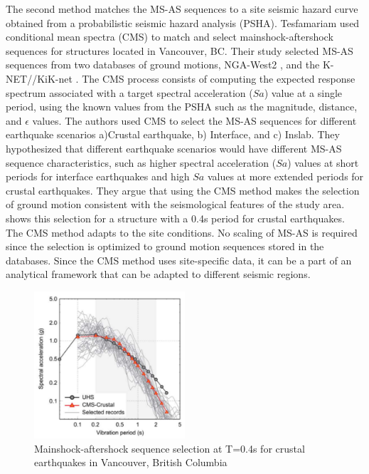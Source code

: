 The second method matches the MS-AS sequences to a site seismic hazard curve obtained from a probabilistic seismic hazard analysis (PSHA). Tesfamariam \cite{Tesfamariam2015} used conditional mean spectra (CMS) to match and select mainshock-aftershock sequences for structures located in Vancouver, BC. Their study selected MS-AS sequences from two databases of ground motions, NGA-West2 \citep{Ancheta2014}, and the K-NET//KiK-net \cite{NIEDK-NETKiK-net2019}. The CMS process consists of computing the expected response spectrum associated with a target spectral acceleration ($Sa$) value at a single period, using the known values from the PSHA such as the magnitude, distance, and $\epsilon$ values. The authors used CMS to select the MS-AS sequences for different earthquake scenarios a)Crustal earthquake, b) Interface, and c) Inslab. They hypothesized that different earthquake scenarios would have different MS-AS sequence characteristics, such as higher spectral acceleration ($Sa$) values at short periods for interface earthquakes and high $Sa$ values at more extended periods for crustal earthquakes. They argue that using the CMS method makes the selection of ground motion consistent with the seismological features of the study area.  shows this selection for a structure with a 0.4s period for crustal earthquakes. The CMS method adapts to the site conditions. No scaling of MS-AS is required since the selection is optimized to ground motion sequences stored in the databases. Since the CMS method uses site-specific data, it can be a part of an analytical framework that can be adapted to different seismic regions.
\begin{figure}[htbp]
\centering
\includegraphics[width=0.5\textwidth]{Chapter-2/figs/CMS-Tesfamariam_MS-AS_seq}
\caption{Mainshock-aftershock sequence selection at T=0.4s for crustal earthquakes in Vancouver, British Columbia \cite{Tesfamariam2015}}
\label{fig:MS-AS_Goda}
\end{figure}

